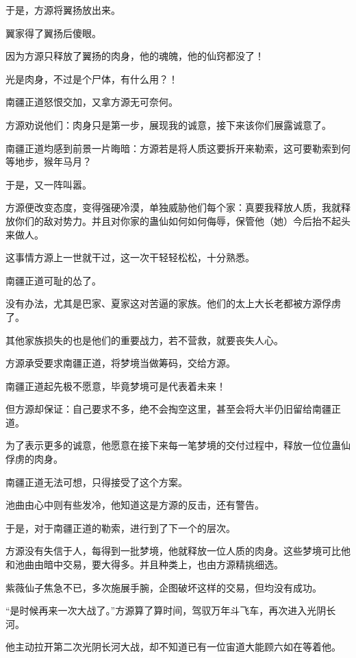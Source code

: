 \begin{this_body}
于是，方源将翼扬放出来。

翼家得了翼扬后傻眼。

因为方源只释放了翼扬的肉身，他的魂魄，他的仙窍都没了！

光是肉身，不过是个尸体，有什么用？！

南疆正道怒恨交加，又拿方源无可奈何。

方源劝说他们：肉身只是第一步，展现我的诚意，接下来该你们展露诚意了。

南疆正道均感到前景一片晦暗：方源若是将人质这要拆开来勒索，这可要勒索到何等地步，猴年马月？

于是，又一阵叫嚣。

方源便改变态度，变得强硬冷漠，单独威胁他们每个家：真要我释放人质，我就释放你们的敌对势力。并且对你家的蛊仙如何如何侮辱，保管他（她）今后抬不起头来做人。

这事情方源上一世就干过，这一次干轻轻松松，十分熟悉。

南疆正道可耻的怂了。

没有办法，尤其是巴家、夏家这对苦逼的家族。他们的太上大长老都被方源俘虏了。

其他家族损失的也是他们的重要战力，若不营救，就要丧失人心。

方源承受要求南疆正道，将梦境当做筹码，交给方源。

南疆正道起先极不愿意，毕竟梦境可是代表着未来！

但方源却保证：自己要求不多，绝不会掏空这里，甚至会将大半仍旧留给南疆正道。

为了表示更多的诚意，他愿意在接下来每一笔梦境的交付过程中，释放一位位蛊仙俘虏的肉身。

南疆正道无法可想，只得接受了这个方案。

池曲由心中则有些发冷，他知道这是方源的反击，还有警告。

于是，对于南疆正道的勒索，进行到了下一个的层次。

方源没有失信于人，每得到一批梦境，他就释放一位人质的肉身。这些梦境可比他和池曲由暗中交易，要大得多。并且种类上，也由方源精挑细选。

紫薇仙子焦急不已，多次施展手腕，企图破坏这样的交易，但均没有成功。

“是时候再来一次大战了。”方源算了算时间，驾驭万年斗飞车，再次进入光阴长河。

他主动拉开第二次光阴长河大战，却不知道已有一位宙道大能顾六如在等着他。

\end{this_body}

